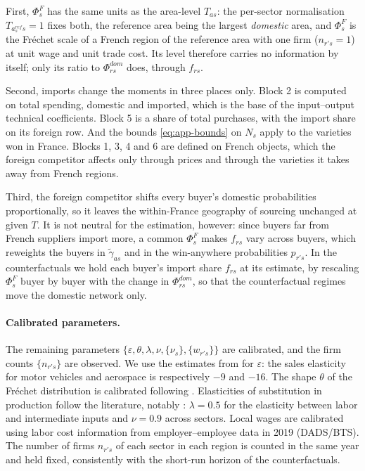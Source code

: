 First, $\Phi^F_s$ has the same units as the area-level $T_{as}$: the per-sector normalisation $T_{a^{ref}_s s}=1$ fixes both, the reference area being the largest \emph{domestic} area, and $\Phi^F_s$ is the Fréchet scale of a French region of the reference area with one firm ($n_{r's}=1$) at unit wage and unit trade cost. Its level therefore carries no information by itself; only its ratio to $\Phi^{dom}_{rs}$ does, through $f_{rs}$.

Second, imports change the moments in three places only. Block 2 is computed on total spending, domestic and imported, which is the base of the input--output technical coefficients. Block 5 is a share of total purchases, with the import share on its foreign row. And the bounds \eqref{eq:app-bounds} on $N_s$ apply to the varieties won in France. Blocks 1, 3, 4 and 6 are defined on French objects, which the foreign competitor affects only through prices and through the varieties it takes away from French regions.

Third, the foreign competitor shifts every buyer's domestic probabilities proportionally, so it leaves the within-France geography of sourcing unchanged at given $T$. It is not neutral for the estimation, however: since buyers far from French suppliers import more, a common $\Phi^F_s$ makes $f_{rs}$ vary across buyers, which reweights the buyers in $\tilde\gamma_{as}$ and in the win-anywhere probabilities $p_{r's}$. In the counterfactuals we hold each buyer's import share $f_{rs}$ at its estimate, by rescaling $\Phi^F_s$ buyer by buyer with the change in $\Phi^{dom}_{rs}$, so that the counterfactual regimes move the domestic network only.

\paragraph{Calibrated parameters.}
\label{app:model-calibration}
The remaining parameters $\{\varepsilon,\theta,\lambda,\nu,\{\nu_{s}\},\{w_{r's}\}\}$ are calibrated, and the firm counts $\{n_{r's}\}$ are observed. We use the estimates from \cite{Fontagn2022} for $\varepsilon$: the sales elasticity for motor vehicles and aerospace is respectively $-9$ and $-16$. The shape $\theta$ of the Fréchet distribution is calibrated following \cite{antras_margins_2017}. Elasticities of substitution in production follow the literature, notably \cite{baqaee_macroeconomic_2019}: $\lambda=0.5$ for the elasticity between labor and intermediate inputs and $\nu=0.9$ across sectors. Local wages are calibrated using labor cost information from employer--employee data in 2019 (DADS/BTS). The number of firms $n_{r's}$ of each sector in each region is counted in the same year and held fixed, consistently with the short-run horizon of the counterfactuals.



